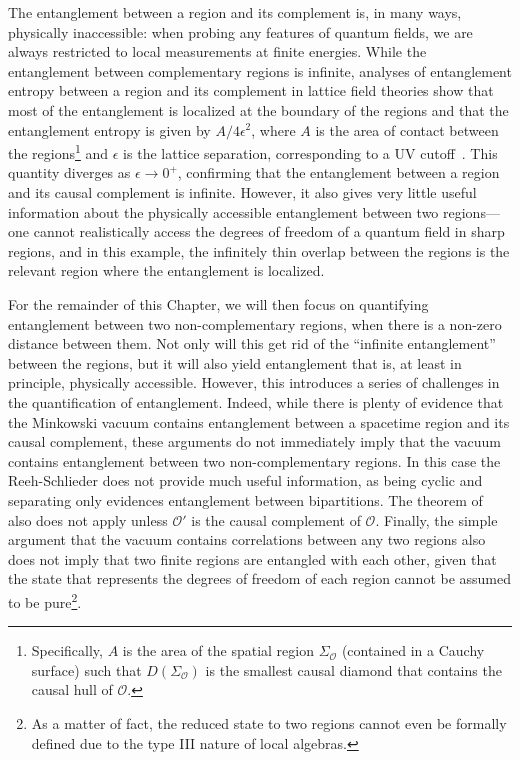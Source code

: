 \documentclass[letterpaper,12pt,titlepage,oneside,final]{book}
\begin{document}
The entanglement between a region and its complement is, in many ways, physically inaccessible: when probing any features of quantum fields, we are always restricted to local measurements at finite energies. While the entanglement between complementary regions is infinite, analyses of entanglement entropy between a region and its complement in lattice field theories show that most of the entanglement is localized at the boundary of the regions and that the entanglement entropy is given by $A/4\epsilon^2$, where $A$ is the area of contact between the regions\footnote{Specifically, $A$ is the area of the spatial region $\Sigma_{\mathcal{O}}$ (contained in a Cauchy surface) such that $D(\Sigma_{\mathcal{O}})$ is the smallest causal diamond that contains the causal hull of $\mathcal{O}$.} and $\epsilon$ is the lattice separation, corresponding to a UV cutoff~\cite{areaLaw1993,AreaLawsCirac2008,areaLawReview2010,Kelly}. This quantity diverges as $\epsilon \to 0^+$, confirming that the entanglement between a region and its causal complement is infinite. However, it also gives very little useful information about the physically accessible entanglement between two regions---one cannot realistically access the degrees of freedom of a quantum field in sharp regions, and in this example, the infinitely thin overlap between the regions is the relevant region where the entanglement is localized.

For the remainder of this Chapter, we will then focus on quantifying entanglement between two non-complementary regions, when there is a non-zero distance between them. Not only will this get rid of the ``infinite entanglement'' between the regions, but it will also yield entanglement that is, at least in principle, physically accessible. However, this introduces a series of challenges in the quantification of entanglement. Indeed, while there is plenty of evidence that the Minkowski vacuum contains entanglement between a spacetime region and its causal complement, these arguments do not immediately imply that the vacuum contains entanglement between two non-complementary regions. In this case the Reeh-Schlieder does not provide much useful information, as being cyclic and separating only evidences entanglement between bipartitions. The theorem of~\cite{universalEmbezzlers} also does not apply unless $\mathcal{O}'$ is the causal complement of $\mathcal{O}$. Finally, the simple argument that the vacuum contains correlations between any two regions also does not imply that two finite regions are entangled with each other, given that the state that represents the degrees of freedom of each region cannot be assumed to be pure\footnote{As a matter of fact, the reduced state to two regions cannot even be formally defined due to the type III nature of local algebras.}.
\end{document}
